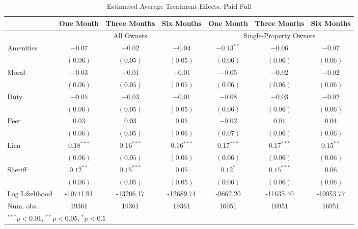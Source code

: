 \documentclass[12pt,titlepage]{article}
\begin{document}
\begin{sidewaystable}[htbp]
\caption{Estimated Average Treatment Effects: Paid Full}
\begin{center}
\begin{tabular}{|l| c c c| c c c| }
\hline
               & One Month & Three Months & Six Months & One Month & Three Months & Six Months \\
\hline
 & \multicolumn{3}{c}{All Owners} & \multicolumn{3}{|c|}{Single-Property Owners} \\
Amenities      & $-0.07$      & $-0.02$      & $-0.04$      & $-0.13^{**}$ & $-0.06$      & $-0.07$     \\
               & $(0.06)$     & $(0.05)$     & $(0.05)$     & $(0.06)$     & $(0.06)$     & $(0.06)$    \\
Moral          & $-0.03$      & $-0.01$      & $-0.01$      & $-0.05$      & $-0.02$      & $-0.02$     \\
               & $(0.06)$     & $(0.05)$     & $(0.05)$     & $(0.06)$     & $(0.06)$     & $(0.06)$    \\
Duty           & $-0.05$      & $-0.03$      & $-0.01$      & $-0.08$      & $-0.03$      & $-0.02$     \\
               & $(0.06)$     & $(0.05)$     & $(0.05)$     & $(0.06)$     & $(0.06)$     & $(0.06)$    \\
Peer           & $0.03$       & $0.03$       & $0.05$       & $-0.02$      & $0.01$       & $0.04$      \\
               & $(0.06)$     & $(0.05)$     & $(0.06)$     & $(0.07)$     & $(0.06)$     & $(0.06)$    \\
Lien           & $0.18^{***}$ & $0.16^{***}$ & $0.16^{***}$ & $0.17^{***}$ & $0.17^{***}$ & $0.15^{**}$ \\
               & $(0.06)$     & $(0.05)$     & $(0.06)$     & $(0.06)$     & $(0.06)$     & $(0.06)$    \\
Sheriff        & $0.12^{**}$  & $0.15^{***}$ & $0.05$       & $0.12^{*}$   & $0.15^{***}$ & $0.06$      \\
               & $(0.06)$     & $(0.05)$     & $(0.05)$     & $(0.06)$     & $(0.06)$     & $(0.06)$    \\
\hline
Log Likelihood & -10741.91    & -13206.17    & -12689.74    & -9662.20     & -11635.40    & -10953.77   \\
Num. obs.      & 19361        & 19361        & 19361        & 16951        & 16951        & 16951       \\
\hline
\multicolumn{7}{l}{\scriptsize{$^{***}p<0.01$, $^{**}p<0.05$, $^*p<0.1$}}
\end{tabular}
\label{tbl:reg7_pf}
\end{center}
\end{sidewaystable}
\end{document}
